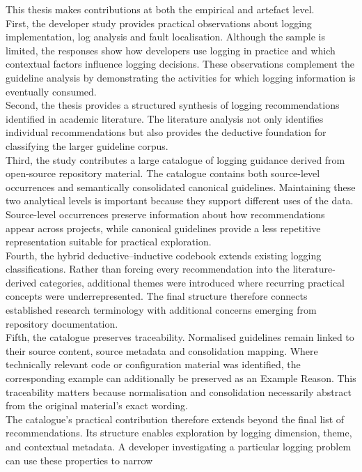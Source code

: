 This thesis makes contributions at both the empirical and artefact level.
\\
First, the developer study provides practical observations about logging implementation, 
log analysis and fault localisation. Although the sample is limited, the responses show 
how developers use logging in practice and which contextual factors influence logging decisions. 
These observations complement the guideline analysis by demonstrating the activities for which logging 
information is eventually consumed.
\\
Second, the thesis provides a structured synthesis of logging recommendations identified in academic literature. 
The literature analysis not only identifies individual recommendations but also provides the deductive 
foundation for classifying the larger guideline corpus.
\\
Third, the study contributes a large catalogue of logging guidance derived from 
open-source repository material. The catalogue contains both source-level occurrences 
and semantically consolidated canonical guidelines. Maintaining these two analytical 
levels is important because they support different uses of the data. Source-level 
occurrences preserve information about how recommendations appear across projects, 
while canonical guidelines provide a less repetitive representation suitable for practical exploration.
\\
Fourth, the hybrid deductive--inductive codebook extends existing logging classifications. 
Rather than forcing every recommendation into the literature-derived categories, additional 
themes were introduced where recurring practical concepts were underrepresented. 
The final structure therefore connects established research terminology with additional 
concerns emerging from repository documentation.
\\
Fifth, the catalogue preserves traceability. Normalised guidelines remain linked to their 
source content, source metadata and consolidation mapping. Where technically 
relevant code or configuration material was identified, the corresponding example 
can additionally be preserved as an Example Reason. This traceability matters
because normalisation and consolidation necessarily abstract from the
original material's exact wording.
\\
The catalogue's practical contribution therefore extends beyond the final list of recommendations. 
Its structure enables exploration by logging dimension, theme, and contextual metadata. 
A developer investigating a particular logging problem can use these properties to narrow 
